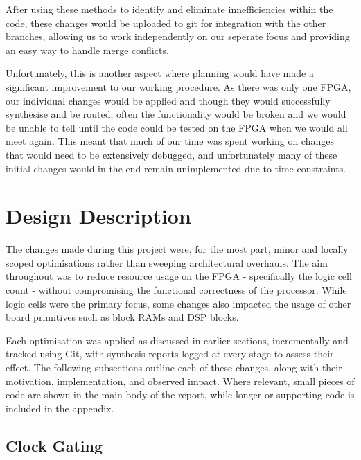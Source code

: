 \documentclass[a4paper,10pt]{article}
\begin{document}
After using these methods to identify and eliminate innefficiencies within the code,
these changes would be uploaded to git for integration with the other branches,
allowing us to work independently on our seperate focus and
providing an easy way to handle merge conflicts.

Unfortunately, this is another aspect where planning would have made a significant
improvement to our working procedure. 
As there was only one FPGA, our individual changes would be applied and
though they would successfully synthesise and be routed,
often the functionality would be broken and we would be unable to tell until 
the code could be tested on the FPGA when we would all meet again.
This meant that much of our time was spent working on changes that would 
need to be extensively debugged, and unfortunately many of these initial changes
would in the end remain unimplemented due to time constraints.

\section{Design Description}
\label{sec:Design_Description}

The changes made during this project were, for the most part, 
minor and locally scoped optimisations rather than sweeping architectural overhauls. 
The aim throughout was to reduce resource usage on the FPGA - 
specifically the logic cell count  - 
without compromising the functional correctness of the processor. 
While logic cells were the primary focus, 
some changes also impacted the usage of other board primitives 
such as block RAMs and DSP blocks. 

Each optimisation was applied as discussed in earlier sections,
incrementally and tracked using Git, 
with synthesis reports logged at every stage to assess their effect. 
The following subsections outline each of these changes, 
along with their motivation, implementation, and observed impact. 
Where relevant, small pieces of code are shown in the main body of the report, 
while longer or supporting code is included in the appendix.

\subsection{Clock Gating}
\label{sec:Gating}
\end{document}
